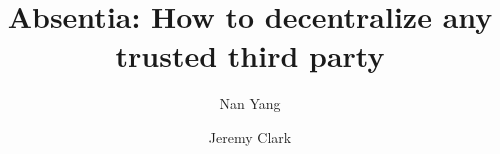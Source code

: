 \documentclass[envcountsect]{llncs}
\begin{document}
\frontmatter
\mainmatter

\title{\Large \bf Absentia: How to decentralize any trusted third party}

\author{
	Nan Yang
	\and
	Jeremy Clark
	}


\maketitle












\clearpage
\appendix
\end{document}
